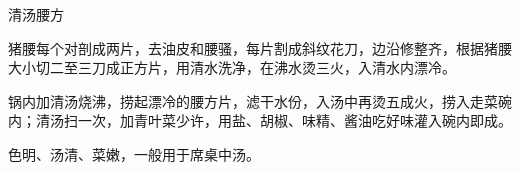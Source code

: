 \begin{recipe}{清汤腰方}

\ingredients


\cooking

\step 猪腰每个对剖成两片，去油皮和腰骚，每片割成斜纹花刀，边沿修整齐，根据猪腰大小切二至三刀成正方片，用清水洗净，在沸水烫三火，入清水内漂冷。

\step 锅内加清汤烧沸，捞起漂冷的腰方片，滤干水份，入汤中再烫五成火，捞入走菜碗内；清汤扫一次，加青叶菜少许，用盐、胡椒、味精、酱油吃好味灌入碗内即成。

\notes

色明、汤清、菜嫩，一般用于席桌中汤。

\end{recipe}

